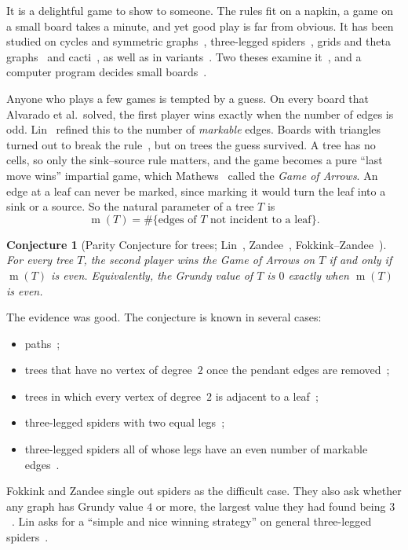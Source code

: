 \documentclass[11pt]{amsart}
\newtheorem{conjecture}[theorem]{Conjecture}
\theoremstyle{definition}
\theoremstyle{remark}
\newcommand{\m}{\operatorname{m}}
\begin{document}
It is a delightful game to show to someone. The rules fit on a napkin, a game on a small board takes a minute, and yet good play is far from obvious. It has been studied on cycles and symmetric graphs~\cite{Alvarado2021}, three-legged spiders~\cite{Mathews2022}, grids and theta graphs~\cite{Barua2022} and cacti~\cite{Cacti2024}, as well as in variants~\cite{Sahai2023}. Two theses examine it~\cite{Lin2021,Zandee2022}, and a computer program decides small boards~\cite{Garcia2025}.

Anyone who plays a few games is tempted by a guess. On every board that Alvarado et al.\ solved, the first player wins exactly when the number of edges is odd. Lin~\cite[Conjecture~4.1]{Lin2021} refined this to the number of \emph{markable} edges. Boards with triangles turned out to break the rule~\cite{Cacti2024,Fokkink2024}, but on trees the guess survived. A tree has no cells, so only the sink--source rule matters, and the game becomes a pure ``last move wins'' impartial game, which Mathews~\cite{Mathews2022} called the \emph{Game of Arrows}. An edge at a leaf can never be marked, since marking it would turn the leaf into a sink or a source. So the natural parameter of a tree $T$ is
\[
  \m(T)=\#\{\text{edges of $T$ not incident to a leaf}\}.
\]

\begin{conjecture}[Parity Conjecture for trees; Lin~\cite{Lin2021}, Zandee~\cite{Zandee2022}, Fokkink--Zandee~\cite{Fokkink2024}]\label{conj:parity}
For every tree $T$, the second player wins the Game of Arrows on $T$ if and only if $\m(T)$ is even. Equivalently, the Grundy value of $T$ is $0$ exactly when $\m(T)$ is even.
\end{conjecture}

The evidence was good. The conjecture is known in several cases:
\begin{itemize}[leftmargin=*]
\item paths~\cite{Lin2021,Zandee2022,Sahai2023};
\item trees that have no vertex of degree~$2$ once the pendant edges are removed~\cite[Theorem~1]{Fokkink2024};
\item trees in which every vertex of degree~$2$ is adjacent to a leaf~\cite[Theorem~4.2]{Zandee2022};
\item three-legged spiders with two equal legs~\cite[Theorem~5.3]{Lin2021};
\item three-legged spiders all of whose legs have an even number of markable edges~\cite{Mathews2022}.
\end{itemize}
Fokkink and Zandee single out spiders as the difficult case. They also ask whether any graph has Grundy value $4$ or more, the largest value they had found being $3$~\cite{Fokkink2024}. Lin asks for a ``simple and nice winning strategy'' on general three-legged spiders~\cite[Section~7.1]{Lin2021}.
\end{document}
